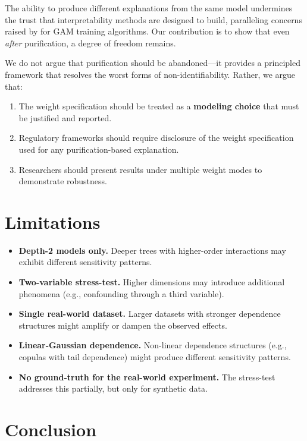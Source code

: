 The ability to produce different explanations from the same model undermines the trust that interpretability methods are designed to build, paralleling concerns raised by \citet{chang2021how} for GAM training algorithms.
Our contribution is to show that even \emph{after} purification, a degree of freedom remains.

We do not argue that purification should be abandoned---it provides a principled framework that resolves the worst forms of non-identifiability.
Rather, we argue that:
\begin{enumerate}
    \item The weight specification should be treated as a \textbf{modeling choice} that must be justified and reported.
    \item Regulatory frameworks should require disclosure of the weight specification used for any purification-based explanation.
    \item Researchers should present results under multiple weight modes to demonstrate robustness.
\end{enumerate}

\section{Limitations}

\begin{itemize}
    \item \textbf{Depth-2 models only.} Deeper trees with higher-order interactions may exhibit different sensitivity patterns.
    \item \textbf{Two-variable stress-test.} Higher dimensions may introduce additional phenomena (e.g., confounding through a third variable).
    \item \textbf{Single real-world dataset.} Larger datasets with stronger dependence structures might amplify or dampen the observed effects.
    \item \textbf{Linear-Gaussian dependence.} Non-linear dependence structures (e.g., copulas with tail dependence) might produce different sensitivity patterns.
    \item \textbf{No ground-truth for the real-world experiment.} The stress-test addresses this partially, but only for synthetic data.
\end{itemize}

\section{Conclusion}

